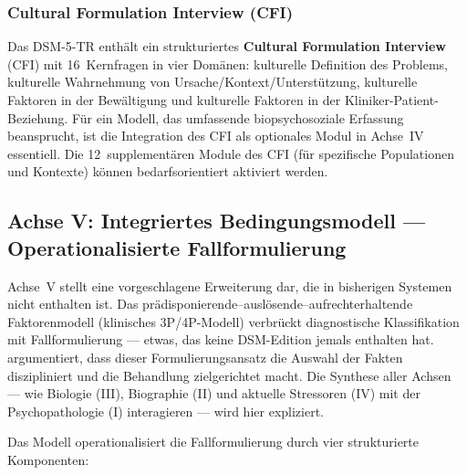 \documentclass[11pt,a4paper]{article}
\begin{document}
\subsubsection{Cultural Formulation Interview (CFI)}

Das DSM-5-TR enth\"alt ein strukturiertes \textbf{Cultural Formulation Interview} (CFI) mit 16~Kernfragen in vier Dom\"anen: kulturelle Definition des Problems, kulturelle Wahrnehmung von Ursache/Kontext/Unterst\"utzung, kulturelle Faktoren in der Bew\"altigung und kulturelle Faktoren in der Kliniker-Patient-Beziehung. F\"ur ein Modell, das umfassende biopsychosoziale Erfassung beansprucht, ist die Integration des CFI als optionales Modul in Achse~IV essentiell. Die 12~supplement\"aren Module des CFI (f\"ur spezifische Populationen und Kontexte) k\"onnen bedarfsorientiert aktiviert werden.

\subsection{Achse V: Integriertes Bedingungsmodell --- Operationalisierte Fallformulierung}
\label{sec:achse5}

Achse~V stellt eine vorgeschlagene Erweiterung dar, die in bisherigen Systemen nicht enthalten ist. Das pr\"adisponierende--ausl\"osende--aufrechterhaltende Faktorenmodell (klinisches 3P/4P-Modell) verbr\"uckt diagnostische Klassifikation mit Fallformulierung --- etwas, das keine DSM-Edition jemals enthalten hat. \citet{Owen2023} argumentiert, dass dieser Formulierungsansatz \glqq die Auswahl der Fakten diszipliniert und die Behandlung zielgerichtet macht\grqq{}. Die Synthese aller Achsen --- wie Biologie (III), Biographie (II) und aktuelle Stressoren (IV) mit der Psychopathologie (I) interagieren --- wird hier expliziert.

Das Modell operationalisiert die Fallformulierung durch vier strukturierte Komponenten:
\end{document}
